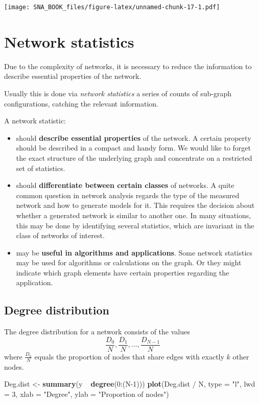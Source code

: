 \documentclass[]{book}
\newenvironment{Shaded}{\begin{snugshade}}{\end{snugshade}}
\newcommand{\KeywordTok}[1]{\textcolor[rgb]{0.13,0.29,0.53}{\textbf{{#1}}}}
\newcommand{\DataTypeTok}[1]{\textcolor[rgb]{0.13,0.29,0.53}{{#1}}}
\newcommand{\DecValTok}[1]{\textcolor[rgb]{0.00,0.00,0.81}{{#1}}}
\newcommand{\StringTok}[1]{\textcolor[rgb]{0.31,0.60,0.02}{{#1}}}
\newcommand{\NormalTok}[1]{{#1}}
\begin{document}
\texttt{[image: SNA\_BOOK\_files/figure-latex/unnamed-chunk-17-1.pdf]}

\section{Network statistics}\label{network-statistics}

Due to the complexity of networks, it is necessary to reduce the
information to describe essential properties of the network.

Usually this is done via \emph{network statistics} a series of counts of
sub-graph configurations, catching the relevant information.

A network statistic:

\begin{itemize}
\item
  should \textbf{describe essential properties} of the network. A
  certain property should be described in a compact and handy form. We
  would like to forget the exact structure of the underlying graph and
  concentrate on a restricted set of statistics.
\item
  should \textbf{differentiate between certain classes} of networks. A
  quite common question in network analysis regards the type of the
  measured network and how to generate models for it. This requires the
  decision about whether a generated network is similar to another one.
  In many situations, this may be done by identifying several
  statistics, which are invariant in the class of networks of interest.
\item
  may be \textbf{useful in algorithms and applications}. Some network
  statistics may be used for algorithms or calculations on the graph. Or
  they might indicate which graph elements have certain properties
  regarding the application.
\end{itemize}

\subsection{Degree distribution}\label{degree-distribution}

The degree distribution for a network consists of the values
\[\frac{D_0}{N}, \frac{D_1}{N}, \dots, \frac{D_{N-1}}{N}\] where
\(\frac{D_{k}}{N}\) equals the proportion of nodes that share edges with
exactly \(k\) other nodes.

\begin{Shaded}
\begin{Highlighting}[]
\NormalTok{Deg.dist <-}\StringTok{ }\KeywordTok{summary}\NormalTok{(y ~}\StringTok{ }\KeywordTok{degree}\NormalTok{(}\DecValTok{0}\NormalTok{:(N}\DecValTok{-1}\NormalTok{)))}
\KeywordTok{plot}\NormalTok{(Deg.dist /}\StringTok{ }\NormalTok{N, }\DataTypeTok{type =} \StringTok{"l"}\NormalTok{, }\DataTypeTok{lwd =} \DecValTok{3}\NormalTok{,}
     \DataTypeTok{xlab =} \StringTok{"Degree"}\NormalTok{,}
     \DataTypeTok{ylab =} \StringTok{"Proportion of nodes"}\NormalTok{)}
\end{Highlighting}
\end{Shaded}
\end{document}
